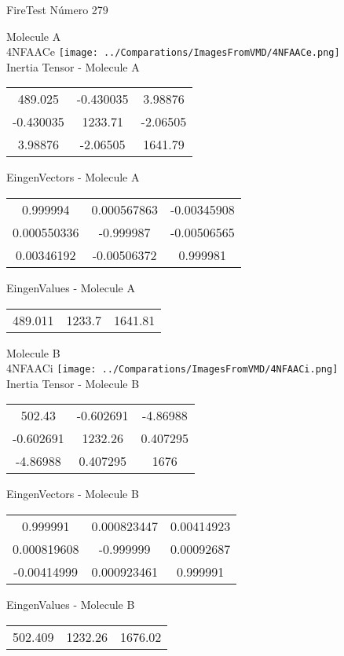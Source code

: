 \vtab[-2cm]
\begin{center}
{\large FireTest \tab Número 279}
\end{center}
\begin{multicols}{2}
\begin{center}

Molecule A \\ 
4NFAACe
\texttt{[image: ../Comparations/ImagesFromVMD/4NFAACe.png]}
\\
Inertia Tensor - Molecule A \\
\vtab

\begin{tabular}{|c c c|}
489.025	 & 	-0.430035	 & 	3.98876	 \\
-0.430035	 & 	1233.71	 & 	-2.06505	 \\
3.98876	 & 	-2.06505	 & 	1641.79
\end{tabular}

\vtab
 EingenVectors - Molecule A     \\
\vtab
\begin{tabular}{|c c c|}
0.999994	 & 	0.000567863	 & 	-0.00345908	 \\
0.000550336	 & 	-0.999987	 & 	-0.00506565	 \\
0.00346192	 & 	-0.00506372	 & 	0.999981
\end{tabular}

\vtab
 EingenValues - Molecule A     \\
\vtab
\begin{tabular}{|c c c|}
489.011	 & 	1233.7	 & 	1641.81	 \\
\end{tabular}
\columnbreak

Molecule B \\ 
4NFAACi
\texttt{[image: ../Comparations/ImagesFromVMD/4NFAACi.png]}
\\
Inertia Tensor - Molecule B \\
\vtab

\begin{tabular}{|c c c|}
502.43	 & 	-0.602691	 & 	-4.86988	 \\
-0.602691	 & 	1232.26	 & 	0.407295	 \\
-4.86988	 & 	0.407295	 & 	1676
\end{tabular}

\vtab
 EingenVectors - Molecule B     \\
\vtab
\begin{tabular}{|c c c|}
0.999991	 & 	0.000823447	 & 	0.00414923	 \\
0.000819608	 & 	-0.999999	 & 	0.00092687	 \\
-0.00414999	 & 	0.000923461	 & 	0.999991
\end{tabular}

\vtab
 EingenValues - Molecule B     \\
\vtab
\begin{tabular}{|c c c|}
502.409	 & 	1232.26	 & 	1676.02	 \\
\end{tabular}

\end{center}
\end{multicols}
